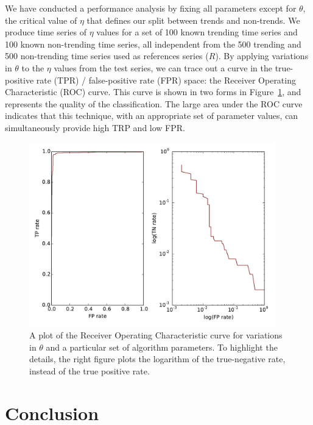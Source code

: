 \documentclass{article}
\begin{document}
We have conducted a performance analysis by fixing all parameters except for $\theta$,
the critical value of $\eta$ that defines our split between trends and non-trends.
We produce time series of $\eta$ values for a set of 100 known trending time series and 100 known
non-trending time series, all independent from the 500 trending and 500 non-trending 
time series used as references series ($R$). By applying variations in $\theta$ 
to the $\eta$ values from the test series, we can trace out a curve in
the true-positive rate (TPR) / false-positive rate (FPR) space: the Receiver Operating
Characteristic (ROC) curve. This curve is shown in two forms in Figure~\ref{fig:roc},
and represents the quality of the classification. The large area under the ROC curve
indicates that this technique, with an appropriate set of parameter values,
can simultaneously provide high TRP and low FPR.

\begin{figure}
\begin{center}
\includegraphics[width=0.95\textwidth]{fig/roc.pdf} 
\caption{A plot of the Receiver Operating Characteristic curve for variations 
in $\theta$ and a particular set of algorithm parameters. To highlight the
details, the right figure plots the logarithm of the true-negative rate, 
instead of the true positive rate.}
\label{fig:roc}
\end{center}
\end{figure}


\section{Conclusion} 
\end{document}
